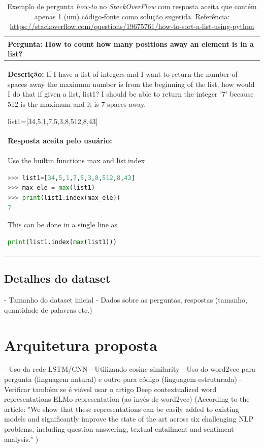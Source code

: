 \begin{table}[h!]
\centering
\begin{tabular}{ |p{14cm}| } 
 \hline
 \textbf{Pergunta:} How to count how many positions away an element is in a list? \\ \hline
 \textbf{Descrição:} If I have a list of integers and I want to return the number of spaces away the maximum number is from the beginning of the list, how would I do that if given a list, list1? I should be able to return the integer '7' because 512 is the maximum and it is 7 spaces away.

 list1=[34,5,1,7,5,3,8,512,8,43]
 \\ \hline
 \textbf{Resposta aceita pelo usuário:}\\ 
 \hline
 Use the builtin functions max and list.index
\begin{lstlisting}[language=Python]
>>> list1=[34,5,1,7,5,3,8,512,8,43]
>>> max_ele = max(list1)
>>> print(list1.index(max_ele))
7
\end{lstlisting}
This can be done in a single line as
\begin{lstlisting}[language=Python]
print(list1.index(max(list1)))
\end{lstlisting}\\
 
 \hline
\end{tabular}
\caption{Exemplo de pergunta \textit{how-to} no \textit{StackOverFlow} com resposta aceita que contém apenas 1 (um) código-fonte como solução sugerida. Referência: \url{https://stackoverflow.com/questions/19675761/how-to-sort-a-list-using-python}}
\label{table:exemplo-pergunta-stack-over-flow-howto}
\end{table}

\subsection{Detalhes do dataset}

 - Tamanho do dataset inicial
 - Dados sobre as perguntas, respostas (tamanho, quantidade de palavras etc.)

\section{Arquitetura proposta} 

- Uso da rede LSTM/CNN 
       - Utilizando cosine similarity
       - Uso do word2vec para pergunta (linguagem natural) e outro para código (linguagem estruturada) - Verificar também se é viável usar o artigo Deep contextualized word representations ELMo representation (ao invés de word2vec) (According to the article: "We show that
these representations can be easily added to
existing models and significantly improve the
state of the art across six challenging NLP
problems, including question answering, textual entailment and sentiment analysis." )





